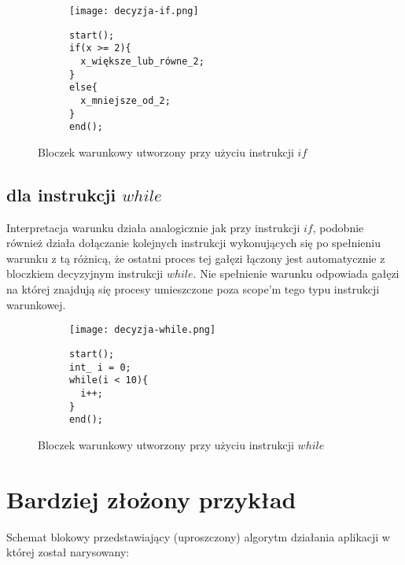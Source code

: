 \begin{figure}[H]
  \begin{subfigure}[t]{0.49\textwidth}
    \vspace{0pt}
    \texttt{[image: decyzja-if.png]}
  \end{subfigure}\hfill
  \begin{subfigure}[t]{0.44\textwidth}
    \begin{verbatim}
start();
if(x >= 2){
  x_większe_lub_równe_2;
}
else{
  x_mniejsze_od_2;
}
end();
    \end{verbatim}
  \end{subfigure}%
  \caption{Bloczek warunkowy utworzony przy użyciu instrukcji $if$}
\end{figure}
	
		\subsection{dla instrukcji $while$}	
	
		Interpretacja warunku działa analogicznie jak przy instrukcji $if$, podobnie również działa dołączanie kolejnych instrukcji wykonujących się po spełnieniu warunku z tą różnicą, że ostatni proces tej gałęzi łączony jest automatycznie z bloczkiem decyzyjnym instrukcji $while$. Nie spełnienie warunku odpowiada gałęzi na której znajdują się procesy umieszczone poza scope'm  tego typu instrukcji warunkowej.
	
				\begin{figure}[H]
  \begin{subfigure}[t]{0.49\textwidth}
    \vspace{0pt}
    \texttt{[image: decyzja-while.png]}
  \end{subfigure}\hfill
  \begin{subfigure}[t]{0.44\textwidth}
    \begin{verbatim}
start();
int_ i = 0;
while(i < 10){
  i++;
}
end();
    \end{verbatim}
  \end{subfigure}%
  \caption{Bloczek warunkowy utworzony przy użyciu instrukcji $while$}
\end{figure}	

\section{Bardziej złożony przykład}
Schemat blokowy przedstawiający (uproszczony) algorytm działania aplikacji w której został narysowany: {\smallskip}

